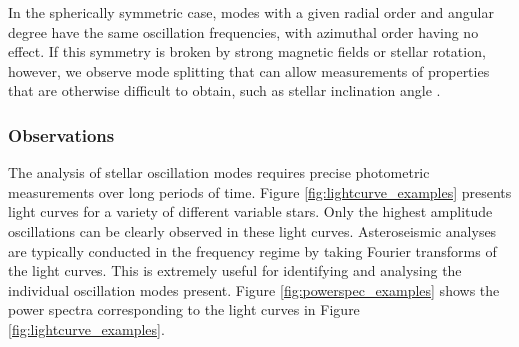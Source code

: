 In the spherically symmetric case, modes with a given radial order and angular degree have the same oscillation frequencies, with azimuthal order having no effect. If this symmetry is broken by strong magnetic fields or stellar rotation, however, we observe mode splitting that can allow measurements of properties that are otherwise difficult to obtain, such as stellar inclination angle \citep{corsaro_spin_2017}. %

\subsubsection{Observations}

The analysis of stellar oscillation modes requires precise photometric measurements over long periods of time. Figure \ref{fig:lightcurve_examples} presents light curves for a variety of different variable stars. Only the highest amplitude oscillations can be clearly observed in these light curves. Asteroseismic analyses are typically conducted in the frequency regime by taking Fourier transforms of the light curves. This is extremely useful for identifying and analysing the individual oscillation modes present. Figure \ref{fig:powerspec_examples} shows the power spectra corresponding to the light curves in Figure \ref{fig:lightcurve_examples}.

